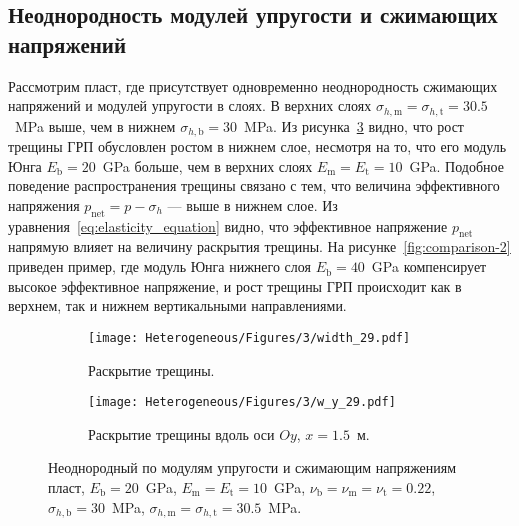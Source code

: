 \subsection{Неоднородность модулей упругости и сжимающих напряжений}
Рассмотрим пласт, где присутствует одновременно неоднородность сжимающих напряжений и модулей упругости в слоях. В верхних слоях $\sigma_{h,\text{m}} = \sigma_{h,\text{t}} = 30.5$~MPa выше, чем в нижнем $\sigma_{h,\text{b}} = 30$~MPa. Из рисунка~\ref{fig:comparison-1} видно, что рост трещины ГРП обусловлен ростом в нижнем слое, несмотря на то, что его модуль Юнга $E_\text{b} = 20$~GPa больше, чем в верхних слоях $E_\text{m} = E_\text{t} = 10$~GPa. Подобное поведение распространения трещины связано с тем, что величина эффективного напряжения $p_\text{net} = p - \sigma_h$ --- выше в нижнем слое. Из уравнения~\eqref{eq:elasticity_equation} видно, что эффективное напряжение $p_\text{net}$ напрямую влияет на величину раскрытия трещины. На рисунке~\ref{fig:comparison-2} приведен пример, где модуль Юнга нижнего слоя $E_\text{b} = 40$~GPa компенсирует высокое эффективное напряжение, и рост трещины ГРП происходит как в верхнем, так и нижнем вертикальными направлениями.

\begin{figure}[htbp]
    \centering
    \begin{subfigure}[t]{0.4\textwidth}
        \centering
        \texttt{[image: Heterogeneous/Figures/3/width\_29.pdf]}
        \caption{Раскрытие трещины.}
        \label{fig:comparison-1-planar}
    \end{subfigure}
    \hfill 
    \begin{subfigure}[t]{0.55\textwidth}
        \centering
        \texttt{[image: Heterogeneous/Figures/3/w\_y\_29.pdf]}
        \caption{Раскрытие трещины вдоль оси $Oy$, $x=1.5$~м.}
        \label{fig:comparison-1-slice}
    \end{subfigure}
    \caption{Неоднородный по модулям упругости и сжимающим напряжениям пласт, $E_\text{b} = 20$~GPa, $E_\text{m} = E_\text{t} = 10$~GPa, $\nu_\text{b} = \nu_\text{m} = \nu_\text{t} = 0.22$, $\sigma_{h,\text{b}} = 30$~MPa, $\sigma_{h,\text{m}} = \sigma_{h,\text{t}} = 30.5$~MPa.}
    \label{fig:comparison-1}
\end{figure}


